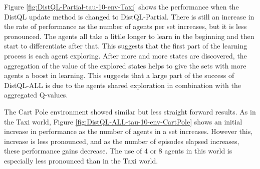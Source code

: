 \documentclass[jair,twoside,11pt,theapa]{article}
\begin{document}
Figure \ref{fig:DistQL-Partial-tau-10-env-Taxi} shows the performance when the DistQL update method is changed to DistQL-Partial. There is still an increase in the rate of performance as the number of agents per set increases, but it is less pronounced. The agents all take a little longer to learn in the beginning and then start to differentiate after that. This suggests that the first part of the learning process is each agent exploring. After more and more states are discovered, the aggregation of the value of the explored states helps to give the sets with more agents a boost in learning. This suggests that a large part of the success of DistQL-ALL is due to the agents shared exploration in combination with the aggregated Q-values. 

The Cart Pole environment showed similar but less straight forward results. As in the Taxi world, Figure \ref{fig:DistQL-ALL-tau-10-env-CartPole} shows an initial increase in performance as the number of agents in a set increases. However this, increase is less pronounced, and as the number of episodes elapsed increases, these performance gains decrease. The use of 4 or 8 agents in this world is especially less pronounced than in the Taxi world. 
\end{document}
